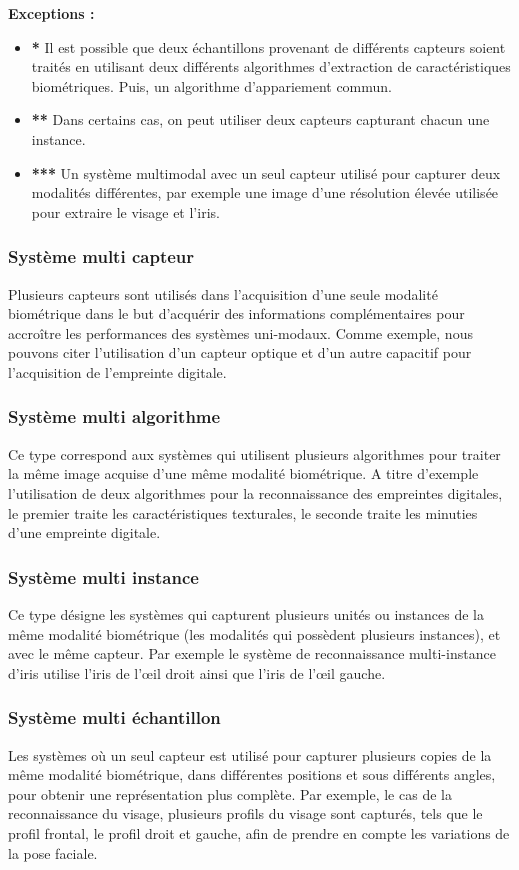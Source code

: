 \textbf{Exceptions : }
\begin{itemize}
	\item \textbf{* }Il est possible que deux échantillons provenant de différents capteurs soient traités en utilisant deux différents algorithmes d'extraction de caractéristiques biométriques. Puis, un algorithme d'appariement commun.
	\item \textbf{** }Dans certains cas, on peut utiliser deux capteurs capturant chacun une instance.
	\item \textbf{*** }Un système multimodal avec un seul capteur utilisé pour capturer deux modalités différentes, par exemple une image d’une résolution élevée utilisée pour extraire le visage et l'iris.
\end{itemize}
\subsubsection{Système multi capteur }
Plusieurs capteurs sont utilisés dans l'acquisition d'une seule modalité biométrique dans le but d'acquérir des informations complémentaires pour accroître les performances des systèmes uni-modaux. Comme exemple, nous pouvons citer l’utilisation d’un capteur optique et d’un autre capacitif pour l'acquisition de l’empreinte digitale.
\subsubsection{Système multi algorithme}
Ce type correspond aux systèmes qui utilisent plusieurs algorithmes pour traiter la même image acquise d'une même modalité biométrique. A titre d'exemple l'utilisation de deux algorithmes pour la reconnaissance des empreintes digitales, le premier traite les caractéristiques texturales, le seconde traite les minuties d’une empreinte digitale. 
\subsubsection{Système multi instance}
Ce type désigne les systèmes qui capturent plusieurs unités ou instances de la même modalité biométrique (les modalités qui possèdent plusieurs instances), et avec le même capteur. Par exemple le système de reconnaissance multi-instance d’iris utilise l’iris de l’œil droit ainsi que l’iris de l’œil gauche.
\subsubsection{Système multi échantillon }
Les systèmes où un seul capteur est utilisé pour capturer plusieurs copies de la même modalité biométrique, dans différentes positions et sous différents angles, pour obtenir une représentation plus complète. Par exemple, le cas de la reconnaissance du visage, plusieurs profils du visage sont capturés, tels que le profil frontal, le profil droit et gauche, afin de prendre en compte les variations de la pose faciale.
